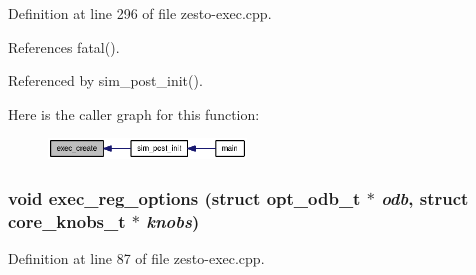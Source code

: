 Definition at line 296 of file zesto-exec.cpp.

References fatal().

Referenced by sim\_\-post\_\-init().

Here is the caller graph for this function:\nopagebreak
\begin{figure}[H]
\begin{center}
\leavevmode
\includegraphics[width=149pt]{zesto-exec_8h_bc3339106471b5130704c973349de0ee_icgraph}
\end{center}
\end{figure}
\subsubsection[{exec\_\-reg\_\-options}]{\setlength{\rightskip}{0pt plus 5cm}void exec\_\-reg\_\-options (struct {\bf opt\_\-odb\_\-t} $\ast$ {\em odb}, \/  struct {\bf core\_\-knobs\_\-t} $\ast$ {\em knobs})}\label{zesto-exec_8h_16c256815d40214f3f1d66f85b3d6598}




Definition at line 87 of file zesto-exec.cpp.

